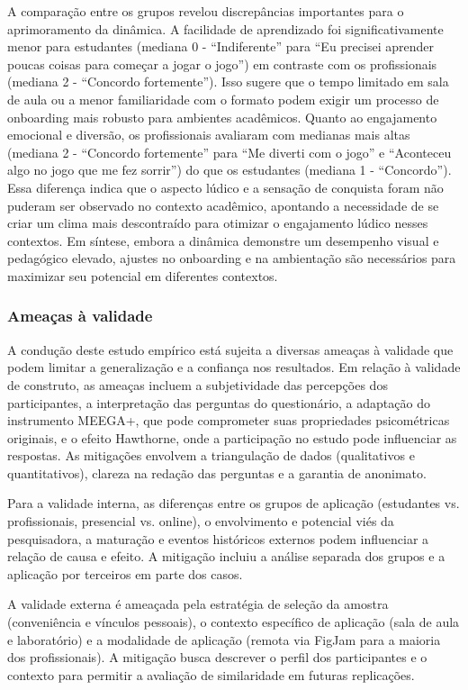 \documentclass[12pt]{article}
\begin{document}
A comparação entre os grupos revelou discrepâncias importantes para o aprimoramento da dinâmica. A facilidade de aprendizado foi significativamente menor para estudantes (mediana 0 - “Indiferente” para “Eu precisei aprender poucas coisas para começar a jogar o jogo”) em contraste com os profissionais (mediana 2 - “Concordo fortemente”). Isso sugere que o tempo limitado em sala de aula ou a menor familiaridade com o formato podem exigir um processo de onboarding mais robusto para ambientes acadêmicos. Quanto ao engajamento emocional e diversão, os profissionais avaliaram com medianas mais altas (mediana 2 - “Concordo fortemente” para “Me diverti com o jogo” e “Aconteceu algo no jogo que me fez sorrir”) do que os estudantes (mediana 1 - “Concordo”). Essa diferença indica que o aspecto lúdico e a sensação de conquista foram não puderam ser observado no contexto acadêmico, apontando a necessidade de se criar um clima mais descontraído para otimizar o engajamento lúdico nesses contextos. Em síntese, embora a dinâmica demonstre um desempenho visual e pedagógico elevado, ajustes no onboarding e na ambientação são necessários para maximizar seu potencial em diferentes contextos.

\subsubsection{Ameaças à validade}

A condução deste estudo empírico está sujeita a diversas ameaças à validade que podem limitar a generalização e a confiança nos resultados. Em relação à validade de construto, as ameaças incluem a subjetividade das percepções dos participantes, a interpretação das perguntas do questionário, a adaptação do instrumento MEEGA+, que pode comprometer suas propriedades psicométricas originais, e o efeito Hawthorne, onde a participação no estudo pode influenciar as respostas. As mitigações envolvem a triangulação de dados (qualitativos e quantitativos), clareza na redação das perguntas e a garantia de anonimato.

Para a validade interna, as diferenças entre os grupos de aplicação (estudantes vs. profissionais, presencial vs. online), o envolvimento e potencial viés da pesquisadora, a maturação e eventos históricos externos podem influenciar a relação de causa e efeito. A mitigação incluiu a análise separada dos grupos e a aplicação por terceiros em parte dos casos.

A validade externa é ameaçada pela estratégia de seleção da amostra (conveniência e vínculos pessoais), o contexto específico de aplicação (sala de aula e laboratório) e a modalidade de aplicação (remota via FigJam para a maioria dos profissionais). A mitigação busca descrever o perfil dos participantes e o contexto para permitir a avaliação de similaridade em futuras replicações.
\end{document}
